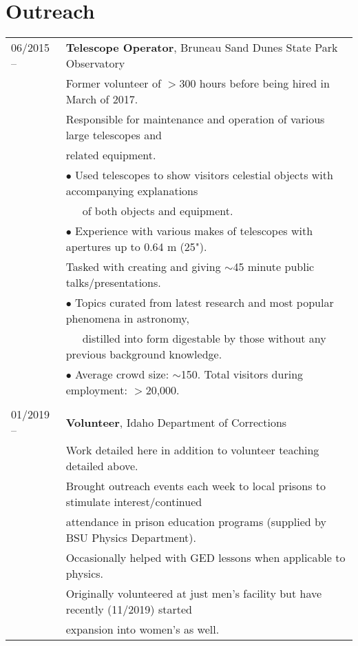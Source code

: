 \documentclass[11pt]{article}
\begin{document}
\section {Outreach}
\begin{tabular}{ll}
06/2015 --    &   \textbf{Telescope Operator}, Bruneau Sand Dunes State Park Observatory \\
      & Former volunteer of $>$300 hours before being hired in March of 2017.\vspace{1mm} \\
      & Responsible for maintenance and operation of various large telescopes and \\
      & related equipment.\\
      & $\bullet$ Used telescopes to show visitors celestial objects with accompanying explanations\\
      & \-\ \-\ \-\ of both objects and equipment.\\
      & $\bullet$ Experience with various makes of telescopes with apertures up to 0.64 m (25").\vspace{1mm} \\
      & Tasked with creating and giving $\sim$45 minute public talks/presentations.\\
      & $\bullet$ Topics curated from latest research and most popular phenomena in astronomy, \\
      & \-\ \-\ \-\ distilled into form digestable by those without any previous background knowledge.\\
      & $\bullet$ Average crowd size: $\sim$150. Total visitors during employment: $>$20,000.\\
      & \\
01/2019 --    &   \textbf{Volunteer}, Idaho Department of Corrections  \\
      & Work detailed here in addition to volunteer teaching detailed above. \vspace{1mm} \\
      & Brought outreach events each week to local prisons to stimulate interest/continued \\
      & attendance in prison education programs (supplied by BSU Physics Department). \\
      & Occasionally helped with GED lessons when applicable to physics.\\
      & Originally volunteered at just men's facility but have recently (11/2019) started \\
      & expansion into women's as well.\vspace{1mm} \\

\end{tabular}
\end{document}

